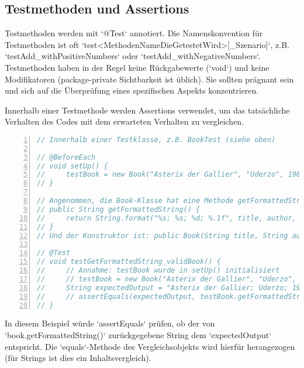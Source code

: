 \subsection{Testmethoden und Assertions}
\label{ssec:junit_testmethoden}
Testmethoden werden mit `@Test` annotiert. Die Namenskonvention für Testmethoden ist oft `test<MethodenNameDieGetestetWird>[_Szenario]`, z.B. `testAdd_withPositiveNumbers` oder `testAdd_withNegativeNumbers`. Testmethoden haben in der Regel keine Rückgabewerte (`void`) und keine Modifikatoren (package-private Sichtbarkeit ist üblich). Sie sollten prägnant sein und sich auf die Überprüfung eines spezifischen Aspekts konzentrieren.

Innerhalb einer Testmethode werden Assertions verwendet, um das tatsächliche Verhalten des Codes mit dem erwarteten Verhalten zu vergleichen.
\begin{lstlisting}[language=Java, caption={Beispiel einer Testmethode mit Assertions}, label=lst:junit_testmethod_example, basicstyle=\ttfamily\footnotesize, breaklines=true, frame=tb, numbers=left]
// Innerhalb einer Testklasse, z.B. BookTest (siehe oben)

// @BeforeEach
// void setUp() {
//     testBook = new Book("Asterix der Gallier", "Uderzo", 1965, 9.8);
// }

// Angenommen, die Book-Klasse hat eine Methode getFormattedString():
// public String getFormattedString() {
//     return String.format("%s; %s; %d; %.1f", title, author, year, price);
// }
// Und der Konstruktor ist: public Book(String title, String author, int year, double price)

// @Test
// void testGetFormattedString_validBook() {
//     // Annahme: testBook wurde in setUp() initialisiert
//     // testBook = new Book("Asterix der Gallier", "Uderzo", 1965, 9.8); // Falls kein setUp
//     String expectedOutput = "Asterix der Gallier; Uderzo; 1965; 9.8";
//     // assertEquals(expectedOutput, testBook.getFormattedString());
// }
\end{lstlisting}
In diesem Beispiel würde `assertEquals` prüfen, ob der von `book.getFormattedString()` zurückgegebene String dem `expectedOutput` entspricht. Die `equals`-Methode des Vergleichsobjekts wird hierfür herangezogen (für Strings ist dies ein Inhaltsvergleich).

